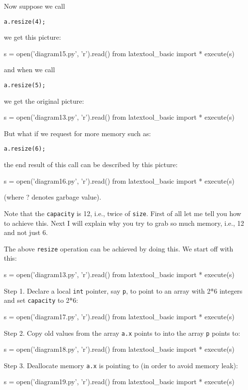 Now suppose we call
\begin{Verbatim}[frame=single]
a.resize(4);
\end{Verbatim}
we get this picture:
\begin{python}
s = open('diagram15.py', 'r').read()
from latextool_basic import *
execute(s)
\end{python}
and when we call
\begin{Verbatim}[frame=single]
a.resize(5);
\end{Verbatim}
we get the original picture:
\begin{python}
s = open('diagram13.py', 'r').read()
from latextool_basic import *
execute(s)
\end{python}

But what if we request for more memory such as:
\begin{Verbatim}[frame=single]
a.resize(6);
\end{Verbatim}
the end result of this call can be described by this picture:
\begin{python}
s = open('diagram16.py', 'r').read()
from latextool_basic import *
execute(s)
\end{python}
(where ? denotes garbage value).

Note that the \verb!capacity! is 12,
i.e., twice of \verb!size!.
First of all 
let me tell you how to achieve this.
Next I will explain why you try to grab 
so much memory, i.e., 12 and not just 6.

The above \verb!resize!
operation can be achieved by doing this.
We start off with this:
\begin{python}
s = open('diagram13.py', 'r').read()
from latextool_basic import *
execute(s)
\end{python}


Step 1.
Declare a local \verb!int! pointer, say \verb!p!,
to point to an array with
2*6 integers and set 
\verb!capacity! to 2*6: 
\begin{python}
s = open('diagram17.py', 'r').read()
from latextool_basic import *
execute(s)
\end{python}

Step 2.
Copy old values
from the array \verb!a.x! points to
into the array \verb!p! points to: 
\begin{python}
s = open('diagram18.py', 'r').read()
from latextool_basic import *
execute(s)
\end{python}

Step 3.
Deallocate memory \verb!a.x! is pointing to (in order to avoid memory leak): 
\begin{python}
s = open('diagram19.py', 'r').read()
from latextool_basic import *
execute(s)
\end{python}

